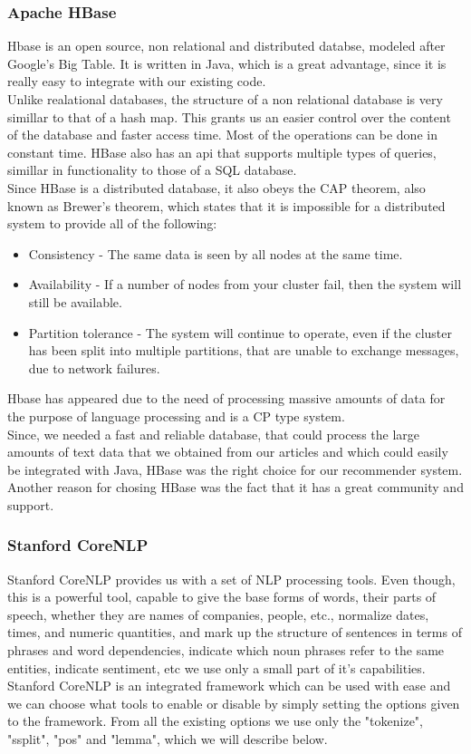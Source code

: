 \subsubsection{Apache HBase}
\label{sec:frameworks-hbase}
Hbase is an open source, non relational and distributed databse, modeled after Google's Big Table. It is written in Java, which is a great advantage, since it is really easy to integrate with our existing code.
\\ Unlike realational databases, the structure of a non relational database is very simillar to that of a hash map. This grants us an easier control over the content of the database and faster access time. Most of the operations can be done in constant time. HBase also has an api that supports multiple types of queries, simillar in functionality to those of a SQL database.
\\ Since HBase is a distributed database, it also obeys the CAP theorem, also known as Brewer's theorem, which states that it is impossible for a distributed system to provide all of the following:

\begin{itemize}
	\item Consistency - The same data is seen by all nodes at the same time.
	\item Availability - If a number of nodes from your cluster fail, then the system will still be available.
	\item Partition tolerance - The system will continue to operate, even if the cluster has been split into multiple partitions, that are unable to exchange messages, due to network failures.
\end{itemize}

Hbase has appeared due to the need of processing massive amounts of data for the purpose of language processing and is a CP type system. 
\\ Since, we needed a fast and reliable database, that could process the large amounts of text data that we obtained from our articles and which could easily be integrated with Java, HBase was the right choice for our recommender system. Another reason for chosing HBase was the fact that it has a great community and support. 

\subsubsection{Stanford CoreNLP}
\label{sec:frameworks-stanford-corenlp}
Stanford CoreNLP\cite{manning-EtAl:2014:P14-5} provides us with a set of NLP processing tools. Even though, this is a powerful tool, capable to give the base forms of words, their parts of speech, whether they are names of companies, people, etc., normalize dates, times, and numeric quantities, and mark up the structure of sentences in terms of phrases and word dependencies, indicate which noun phrases refer to the same entities, indicate sentiment, etc we use only a small part of it's capabilities.
Stanford CoreNLP is an integrated framework which can be used with ease and we can choose what tools to enable or disable by simply setting the options given to the framework. 
From all the existing options we use only the "tokenize", "ssplit", "pos" and "lemma", which we will describe below.

